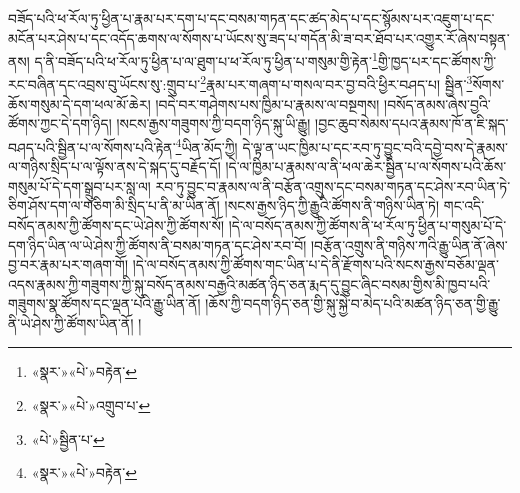 བཟོད་པའི་ཕ་རོལ་ཏུ་ཕྱིན་པ་རྣམ་པར་དག་པ་དང་བསམ་གཏན་དང་ཚད་མེད་པ་དང་སྙོམས་པར་འཇུག་པ་དང་མངོན་པར་ཤེས་པ་དང་འདོད་ཆགས་ལ་སོགས་པ་ཡོངས་སུ་ཟད་པ་གདོན་མི་ཟ་བར་ཐོབ་པར་འགྱུར་རོ་ཞེས་བསྟན་ནས། ད་ནི་བཟོད་པའི་ཕ་རོལ་ཏུ་ཕྱིན་པ་ལ་ཐུག་པ་ཕ་རོལ་ཏུ་ཕྱིན་པ་གསུམ་གྱི་རྟེན་\footnote{«སྣར་»«པེ་»བརྟེན་}གྱི་ཁྱད་པར་དང་ཚོགས་ཀྱི་རང་བཞིན་དང་འབྲས་བུ་ཡོངས་སུ་:གྲུབ་པ་\footnote{«སྣར་»«པེ་»འགྲུབ་པ་}རྣམ་པར་གཞག་པ་གསལ་བར་བྱ་བའི་ཕྱིར་བཤད་པ། སྦྱིན་\footnote{«པེ་»སྦྱིན་པ་}སོགས་ཆོས་གསུམ་དེ་དག་ཕལ་མོ་ཆེར། །བདེ་བར་གཤེགས་པས་ཁྱིམ་པ་རྣམས་ལ་བསྔགས། །བསོད་ནམས་ཞེས་བྱའི་ཚོགས་ཀྱང་དེ་དག་ཉིད། །སངས་རྒྱས་གཟུགས་ཀྱི་བདག་ཉིད་སྐུ་ཡི་རྒྱུ། །བྱང་ཆུབ་སེམས་དཔའ་རྣམས་ཁོ་ན་ཇི་སྐད་བཤད་པའི་སྦྱིན་པ་ལ་སོགས་པའི་རྟེན་\footnote{«སྣར་»«པེ་»བརྟེན་}ཡིན་མོད་ཀྱི། དེ་ལྟ་ན་ཡང་ཁྱིམ་པ་དང་རབ་ཏུ་བྱུང་བའི་དབྱེ་བས་དེ་རྣམས་ལ་གཉིས་སྲིད་པ་ལ་ལྟོས་ནས་དེ་སྐད་དུ་བརྗོད་དོ། །དེ་ལ་ཁྱིམ་པ་རྣམས་ལ་ནི་ཕལ་ཆེར་སྦྱིན་པ་ལ་སོགས་པའི་ཆོས་གསུམ་པོ་དེ་དག་སྒྲུབ་པར་སླ་ལ། རབ་ཏུ་བྱུང་བ་རྣམས་ལ་ནི་བརྩོན་འགྲུས་དང་བསམ་གཏན་དང་ཤེས་རབ་ཡིན་ཏེ་ཅིག་ཤོས་དག་ལ་གཅིག་མི་སྲིད་པ་ནི་མ་ཡིན་ནོ། །སངས་རྒྱས་ཉིད་ཀྱི་རྒྱུའི་ཚོགས་ནི་གཉིས་ཡིན་ཏེ། གང་འདི་བསོད་ནམས་ཀྱི་ཚོགས་དང་ཡེ་ཤེས་ཀྱི་ཚོགས་སོ། །དེ་ལ་བསོད་ནམས་ཀྱི་ཚོགས་ནི་ཕ་རོལ་ཏུ་ཕྱིན་པ་གསུམ་པོ་དེ་དག་ཉིད་ཡིན་ལ་ཡེ་ཤེས་ཀྱི་ཚོགས་ནི་བསམ་གཏན་དང་ཤེས་རབ་བོ། །བརྩོན་འགྲུས་ནི་གཉིས་ཀའི་རྒྱུ་ཡིན་ནོ་ཞེས་བྱ་བར་རྣམ་པར་གཞག་གོ། །དེ་ལ་བསོད་ནམས་ཀྱི་ཚོགས་གང་ཡིན་པ་དེ་ནི་རྫོགས་པའི་སངས་རྒྱས་བཅོམ་ལྡན་འདས་རྣམས་ཀྱི་གཟུགས་ཀྱི་སྐུ་བསོད་ནམས་བརྒྱའི་མཚན་ཉིད་ཅན་རྨད་དུ་བྱུང་ཞིང་བསམ་གྱིས་མི་ཁྱབ་པའི་གཟུགས་སྣ་ཚོགས་དང་ལྡན་པའི་རྒྱུ་ཡིན་ནོ། །ཆོས་ཀྱི་བདག་ཉིད་ཅན་གྱི་སྐུ་སྐྱེ་བ་མེད་པའི་མཚན་ཉིད་ཅན་གྱི་རྒྱུ་ནི་ཡེ་ཤེས་ཀྱི་ཚོགས་ཡིན་ནོ། །

